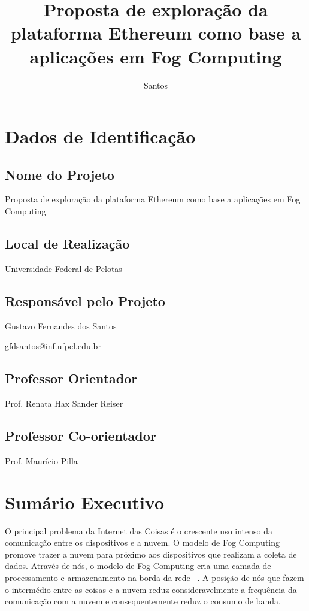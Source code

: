 \documentclass[tcc-proposta]{texufpel}
\title{Proposta de exploração da plataforma Ethereum como base a aplicações em Fog Computing}
\author{Santos}{Gustavo Fernandes dos}
\begin{document}
\renewcommand{\advisorname}{Orientadora}           %
	
\maketitle 
\sloppy
	
\chapter{Dados de Identificação}
	
\section{Nome do Projeto}
Proposta de exploração da plataforma Ethereum como base a aplicações em Fog Computing
	
\section{Local de Realização}
Universidade Federal de Pelotas
	
\section{Responsável pelo Projeto}
Gustavo Fernandes dos Santos
	
gfdsantos@inf.ufpel.edu.br
	
\section{Professor Orientador}
Prof. Renata Hax Sander Reiser
	
\section{Professor Co-orientador}
Prof. Maurício Pilla
	
\chapter{Sumário Executivo}
	
O principal problema da Internet das Coisas é o crescente uso intenso da comunicação entre os dispositivos e a nuvem. O modelo de Fog Computing promove trazer a nuvem para próximo aos dispositivos que realizam a coleta de dados. Através de nós, o modelo de Fog Computing cria uma camada de processamento e armazenamento na borda da rede ~\cite{Bonomi2012}. A posição de nós que fazem o intermédio entre as coisas e a nuvem reduz consideravelmente a frequência da comunicação com a nuvem e consequentemente reduz o consumo de banda.
	
\end{document}
